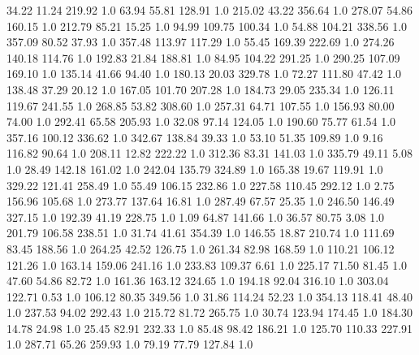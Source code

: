      34.22     11.24    219.92  1.0
     63.94     55.81    128.91  1.0
    215.02     43.22    356.64  1.0
    278.07     54.86    160.15  1.0
    212.79     85.21     15.25  1.0
     94.99    109.75    100.34  1.0
     54.88    104.21    338.56  1.0
    357.09     80.52     37.93  1.0
    357.48    113.97    117.29  1.0
     55.45    169.39    222.69  1.0
    274.26    140.18    114.76  1.0
    192.83     21.84    188.81  1.0
     84.95    104.22    291.25  1.0
    290.25    107.09    169.10  1.0
    135.14     41.66     94.40  1.0
    180.13     20.03    329.78  1.0
     72.27    111.80     47.42  1.0
    138.48     37.29     20.12  1.0
    167.05    101.70    207.28  1.0
    184.73     29.05    235.34  1.0
    126.11    119.67    241.55  1.0
    268.85     53.82    308.60  1.0
    257.31     64.71    107.55  1.0
    156.93     80.00     74.00  1.0
    292.41     65.58    205.93  1.0
     32.08     97.14    124.05  1.0
    190.60     75.77     61.54  1.0
    357.16    100.12    336.62  1.0
    342.67    138.84     39.33  1.0
     53.10     51.35    109.89  1.0
      9.16    116.82     90.64  1.0
    208.11     12.82    222.22  1.0
    312.36     83.31    141.03  1.0
    335.79     49.11      5.08  1.0
     28.49    142.18    161.02  1.0
    242.04    135.79    324.89  1.0
    165.38     19.67    119.91  1.0
    329.22    121.41    258.49  1.0
     55.49    106.15    232.86  1.0
    227.58    110.45    292.12  1.0
      2.75    156.96    105.68  1.0
    273.77    137.64     16.81  1.0
    287.49     67.57     25.35  1.0
    246.50    146.49    327.15  1.0
    192.39     41.19    228.75  1.0
      1.09     64.87    141.66  1.0
     36.57     80.75      3.08  1.0
    201.79    106.58    238.51  1.0
     31.74     41.61    354.39  1.0
    146.55     18.87    210.74  1.0
    111.69     83.45    188.56  1.0
    264.25     42.52    126.75  1.0
    261.34     82.98    168.59  1.0
    110.21    106.12    121.26  1.0
    163.14    159.06    241.16  1.0
    233.83    109.37      6.61  1.0
    225.17     71.50     81.45  1.0
     47.60     54.86     82.72  1.0
    161.36    163.12    324.65  1.0
    194.18     92.04    316.10  1.0
    303.04    122.71      0.53  1.0
    106.12     80.35    349.56  1.0
     31.86    114.24     52.23  1.0
    354.13    118.41     48.40  1.0
    237.53     94.02    292.43  1.0
    215.72     81.72    265.75  1.0
     30.74    123.94    174.45  1.0
    184.30     14.78     24.98  1.0
     25.45     82.91    232.33  1.0
     85.48     98.42    186.21  1.0
    125.70    110.33    227.91  1.0
    287.71     65.26    259.93  1.0
     79.19     77.79    127.84  1.0
